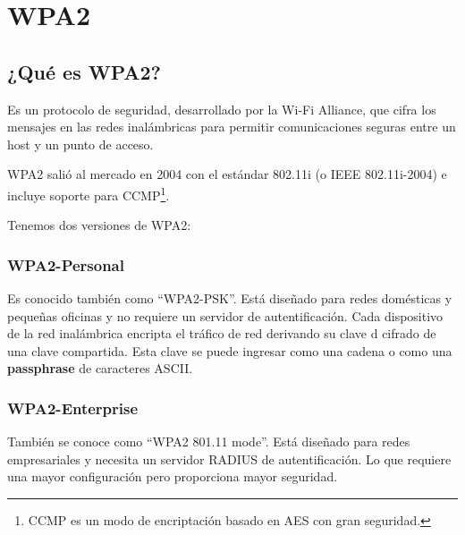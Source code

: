 \chapter{WPA2}
\section{¿Qué es WPA2?} %
Es un protocolo de seguridad, desarrollado por la Wi-Fi Alliance, que cifra los mensajes en las redes inalámbricas para permitir comunicaciones seguras entre un host y un punto de acceso.

WPA2 salió al mercado en 2004 con el estándar 802.11i (o IEEE 802.11i-2004) e incluye soporte para CCMP\footnote{CCMP es un modo de encriptación basado en AES con gran seguridad.}.


Tenemos dos versiones de WPA2:

\subsection{WPA2-Personal} %
Es conocido también como ``WPA2-PSK''. Está diseñado para redes domésticas y pequeñas oficinas y no requiere un servidor de autentificación. Cada dispositivo de la red inalámbrica encripta el tráfico de red derivando su clave d cifrado de una clave compartida. Esta clave se puede ingresar como una cadena o como una \textbf{passphrase} de caracteres ASCII.

\subsection{WPA2-Enterprise} %
También se conoce como ``WPA2 801.11 mode''. Está diseñado para redes empresariales y necesita un servidor RADIUS de autentificación. Lo que requiere una mayor configuración pero proporciona mayor seguridad.


